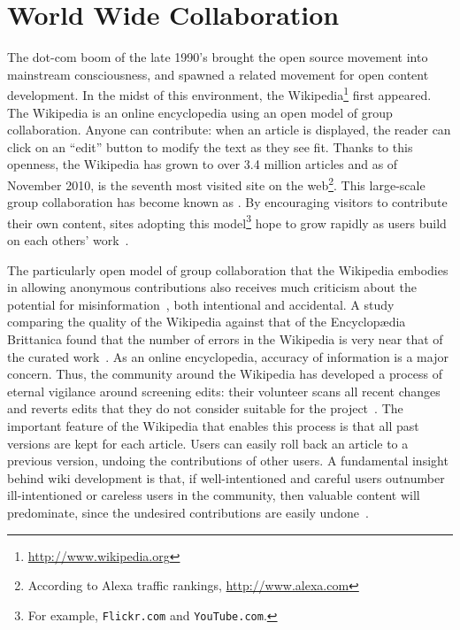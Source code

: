 \section{World Wide Collaboration}

The dot-com boom of the late 1990's brought the open source movement into
mainstream consciousness, and spawned a related movement for open
content development.
In the midst of this environment, the
Wikipedia\footnote{\url{http://www.wikipedia.org}}
first appeared.
The Wikipedia
is an online encyclopedia using an open model of group collaboration.
Anyone can contribute: when an article is
displayed, the reader can click on an ``edit'' button to modify
the text as they see fit.
Thanks to this openness, the Wikipedia has grown to
over 3.4 million articles and as of November 2010, is the seventh most visited site on the
web\footnote{According to Alexa traffic rankings, \url{http://www.alexa.com}}.
This large-scale group collaboration
has become known as .
By encouraging visitors to contribute their own content,
sites adopting this model\footnote{For example,
\texttt{Flickr.com} and \texttt{YouTube.com}.}
hope to grow rapidly as users build on each others' work~\cite{Taylor2007}.



The particularly open model of group collaboration that the Wikipedia embodies
in allowing anonymous contributions
also receives much criticism about the potential for
misinformation~\cite{Seigenthaler05,NewYorkTimes05a,Lehmann2006,NewZelandHerald06,Davis2006,Stross2006,Schiff2006,BBC07},
both intentional and accidental.
A study comparing the quality of the Wikipedia against that
of the Encyclop{\ae}dia Brittanica found that the number of errors
in the Wikipedia is very near that of the curated work~\cite{Giles2005}.
As an online encyclopedia, accuracy of information is a major concern.
Thus, the community around the Wikipedia has developed a process
of eternal vigilance around screening edits: their volunteer  scans
all recent changes and reverts edits that they do not consider
suitable for the project~\cite{wiki:RCPatrol}.
The important feature of the Wikipedia that enables this
process is that all past versions are kept for each article.
Users can easily roll back an article to a previous version,
undoing the contributions of other users.
A fundamental insight behind wiki development is that,
if well-intentioned and careful users outnumber ill-intentioned
or careless users in the community, then valuable content will predominate,
since the undesired contributions are easily undone~\cite{Leuf2001}.

